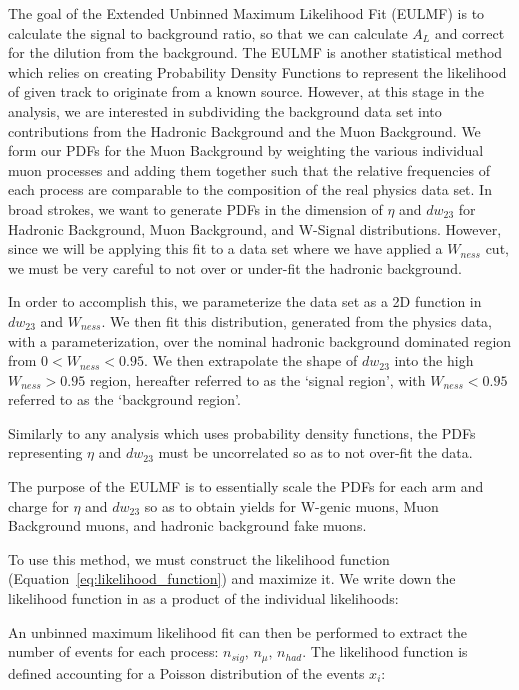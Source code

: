 The goal of the Extended Unbinned Maximum Likelihood Fit (EULMF) is to calculate
the signal to background ratio, so that we can calculate $A_L$ and correct for
the dilution from the background. The EULMF is another statistical method which
relies on creating Probability Density Functions to represent the likelihood of
given track to originate from a known source. However, at this stage in the
analysis, we are interested in subdividing the background data set into
contributions from the Hadronic Background and the Muon Background. We form our
PDFs for the Muon Background by weighting the various individual muon
processes and adding them together such that the relative frequencies of each
process are comparable to the composition of the real physics data set. In broad
strokes, we want to generate PDFs in the dimension of $\eta$ and $dw_{23}$ for
Hadronic Background, Muon Background, and W-Signal distributions. However, since
we will be applying this fit to a data set where we have applied a $W_{ness}$
cut, we must be very careful to not over or under-fit the hadronic background. 

In order to accomplish this, we parameterize the data set as a 2D function in
$dw_{23}$ and $W_{ness}$. We then fit this distribution, generated from the
physics data, with a parameterization, over the nominal hadronic background
dominated region from $0 < W_{ness} < 0.95$. We then extrapolate the shape
of $dw_{23}$ into the high $W_{ness} > 0.95$ region, hereafter referred to as
the `signal region', with $W_{ness} < 0.95$ referred to as the `background
region'.

Similarly to any analysis which uses probability density functions, the PDFs
representing $\eta$ and $dw_{23}$ must be uncorrelated so as to not over-fit
the data.

The purpose of the EULMF is to essentially scale the PDFs for each arm and
charge for $\eta$ and $dw_{23}$ so as to obtain yields for W-genic muons, Muon
Background muons, and hadronic background fake muons.

To use this method, we must construct the likelihood function
(Equation~\ref{eq:likelihood_function}) and maximize it. We write down the
likelihood function in as a product of the individual likelihoods:


An unbinned maximum likelihood fit can then be performed to extract the number
of events for each process: $n_{sig},\,n_\mu,\, n_{had}$. The likelihood
function is defined accounting for a Poisson  distribution of the events $x_i$:

